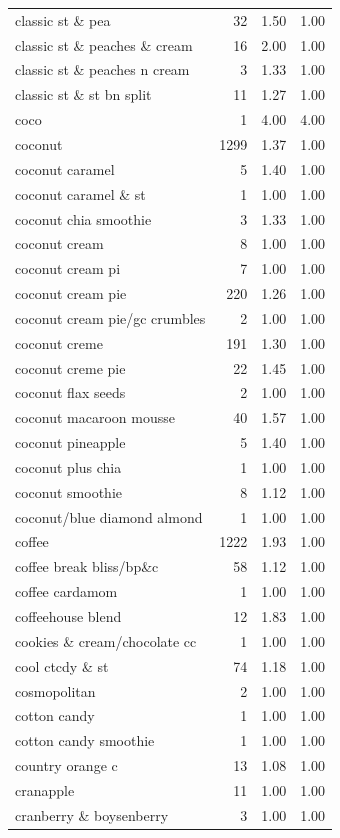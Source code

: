 \begin{table}
\begin{tabular}{lrrr}
classic st \& pea & 32 & 1.50 & 1.00 \\
classic st \& peaches \& cream & 16 & 2.00 & 1.00 \\
classic st \& peaches n cream & 3 & 1.33 & 1.00 \\
classic st \& st bn split & 11 & 1.27 & 1.00 \\
coco & 1 & 4.00 & 4.00 \\
coconut & 1299 & 1.37 & 1.00 \\
coconut caramel & 5 & 1.40 & 1.00 \\
coconut caramel \& st & 1 & 1.00 & 1.00 \\
coconut chia smoothie & 3 & 1.33 & 1.00 \\
coconut cream & 8 & 1.00 & 1.00 \\
coconut cream pi & 7 & 1.00 & 1.00 \\
coconut cream pie & 220 & 1.26 & 1.00 \\
coconut cream pie/gc crumbles & 2 & 1.00 & 1.00 \\
coconut creme & 191 & 1.30 & 1.00 \\
coconut creme pie & 22 & 1.45 & 1.00 \\
coconut flax seeds & 2 & 1.00 & 1.00 \\
coconut macaroon mousse & 40 & 1.57 & 1.00 \\
coconut pineapple & 5 & 1.40 & 1.00 \\
coconut plus chia & 1 & 1.00 & 1.00 \\
coconut smoothie & 8 & 1.12 & 1.00 \\
coconut/blue diamond almond & 1 & 1.00 & 1.00 \\
coffee & 1222 & 1.93 & 1.00 \\
coffee break bliss/bp\&c & 58 & 1.12 & 1.00 \\
coffee cardamom & 1 & 1.00 & 1.00 \\
coffeehouse blend & 12 & 1.83 & 1.00 \\
cookies \& cream/chocolate cc & 1 & 1.00 & 1.00 \\
cool ctcdy \& st & 74 & 1.18 & 1.00 \\
cosmopolitan & 2 & 1.00 & 1.00 \\
cotton candy & 1 & 1.00 & 1.00 \\
cotton candy smoothie & 1 & 1.00 & 1.00 \\
country orange c & 13 & 1.08 & 1.00 \\
cranapple & 11 & 1.00 & 1.00 \\
cranberry \& boysenberry & 3 & 1.00 & 1.00 \\

\end{tabular}
\end{table}
